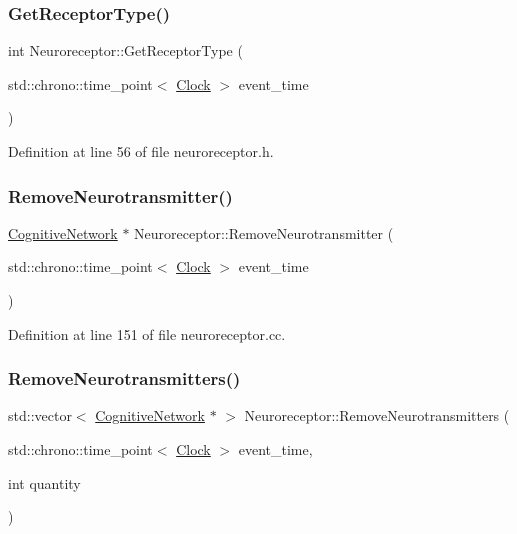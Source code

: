 \subsubsection{\texorpdfstring{Get\+Receptor\+Type()}{GetReceptorType()}}
{\footnotesize\ttfamily int Neuroreceptor\+::\+Get\+Receptor\+Type (\begin{DoxyParamCaption}\item[{std\+::chrono\+::time\+\_\+point$<$ \mbox{\hyperlink{universe_8h_a0ef8d951d1ca5ab3cfaf7ab4c7a6fd80}{Clock}} $>$}]{event\+\_\+time }\end{DoxyParamCaption})\hspace{0.3cm}{\ttfamily [inline]}}



Definition at line 56 of file neuroreceptor.\+h.

\mbox{\label{class_neuroreceptor_a7e94ac827de7abbac585639edfd4f985}} 
\subsubsection{\texorpdfstring{Remove\+Neurotransmitter()}{RemoveNeurotransmitter()}}
{\footnotesize\ttfamily \mbox{\hyperlink{class_cognitive_network}{Cognitive\+Network}} $\ast$ Neuroreceptor\+::\+Remove\+Neurotransmitter (\begin{DoxyParamCaption}\item[{std\+::chrono\+::time\+\_\+point$<$ \mbox{\hyperlink{universe_8h_a0ef8d951d1ca5ab3cfaf7ab4c7a6fd80}{Clock}} $>$}]{event\+\_\+time }\end{DoxyParamCaption})}



Definition at line 151 of file neuroreceptor.\+cc.

\mbox{\label{class_neuroreceptor_ad760106ce6194ac02959c1882bd0f327}} 
\subsubsection{\texorpdfstring{Remove\+Neurotransmitters()}{RemoveNeurotransmitters()}}
{\footnotesize\ttfamily std\+::vector$<$ \mbox{\hyperlink{class_cognitive_network}{Cognitive\+Network}} $\ast$ $>$ Neuroreceptor\+::\+Remove\+Neurotransmitters (\begin{DoxyParamCaption}\item[{std\+::chrono\+::time\+\_\+point$<$ \mbox{\hyperlink{universe_8h_a0ef8d951d1ca5ab3cfaf7ab4c7a6fd80}{Clock}} $>$}]{event\+\_\+time,  }\item[{int}]{quantity }\end{DoxyParamCaption})}



